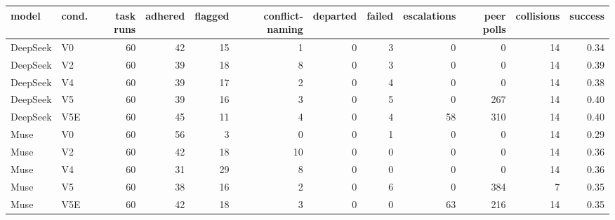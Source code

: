 \begin{tabular}{llrrrrrrrrrr}
\toprule
model & cond. & task runs & adhered & flagged & conflict-naming & departed & failed & escalations & peer polls & collisions & success \\
\midrule
DeepSeek & V0 & 60 & 42 & 15 & 1 & 0 & 3 & 0 & 0 & 14 & 0.34 \\
DeepSeek & V2 & 60 & 39 & 18 & 8 & 0 & 3 & 0 & 0 & 14 & 0.39 \\
DeepSeek & V4 & 60 & 39 & 17 & 2 & 0 & 4 & 0 & 0 & 14 & 0.38 \\
DeepSeek & V5 & 60 & 39 & 16 & 3 & 0 & 5 & 0 & 267 & 14 & 0.40 \\
DeepSeek & V5E & 60 & 45 & 11 & 4 & 0 & 4 & 58 & 310 & 14 & 0.40 \\
Muse & V0 & 60 & 56 & 3 & 0 & 0 & 1 & 0 & 0 & 14 & 0.29 \\
Muse & V2 & 60 & 42 & 18 & 10 & 0 & 0 & 0 & 0 & 14 & 0.36 \\
Muse & V4 & 60 & 31 & 29 & 8 & 0 & 0 & 0 & 0 & 14 & 0.36 \\
Muse & V5 & 60 & 38 & 16 & 2 & 0 & 6 & 0 & 384 & 7 & 0.35 \\
Muse & V5E & 60 & 42 & 18 & 3 & 0 & 0 & 63 & 216 & 14 & 0.35 \\
\bottomrule
\end{tabular}
